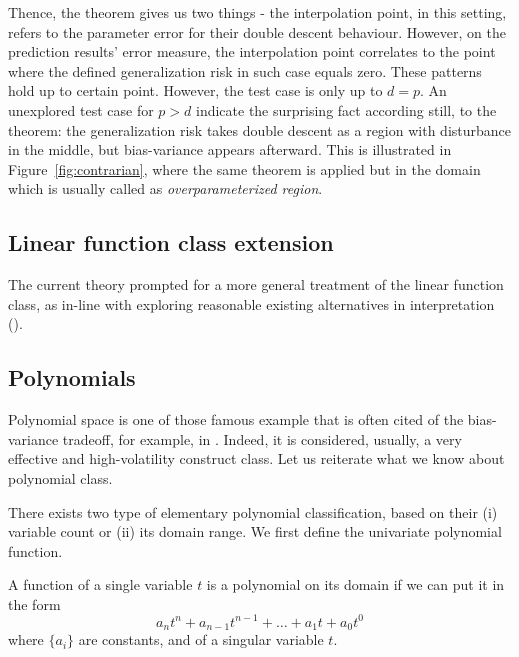 \documentclass[10pt]{article} %
\begin{document}
Thence, the theorem gives us two things - the interpolation point, in this setting, refers to the parameter error for their double descent behaviour. However, on the prediction results' error measure, the interpolation point correlates to the point where the defined generalization risk in such case equals zero. These patterns hold up to certain point. However, the test case is only up to $d=p$. An unexplored test case for $p>d$ indicate the surprising fact according still, to the theorem: the generalization risk takes double descent as a region with disturbance in the middle, but bias-variance appears afterward. This is illustrated in Figure~\ref{fig:contrarian}, where the same theorem is applied but in the domain which is usually called as \textit{overparameterized region}. 
\subsection{Linear function class extension}

The current theory prompted for a more general treatment of the linear function class, as in-line with exploring reasonable existing alternatives in interpretation (\cite{nakkiran2019datahurtlinearregression}).

\clearpage

\subsection{Polynomials}

Polynomial space is one of those famous example that is often cited of the bias-variance tradeoff, for example, in \cite{goodfellow2016deep,10.5555/2930837}. Indeed, it is considered, usually, a very effective and high-volatility construct class. Let us reiterate what we know about polynomial class. 

There exists two type of elementary polynomial classification, based on their (i) variable count or (ii) its domain range. We first define the univariate polynomial function.

\begin{definition}
    A function of a single variable $t$ is a polynomial on its domain if we can put it in the form 
    \begin{equation}
        a_{n}t^{n} + a_{n-1}t^{n-1} + \dots + a_{1}t + a_{0}t^{0}
    \end{equation}
    where $\{a_{i}\}$ are constants, and of a singular variable $t$.  
\end{definition}
\end{document}
